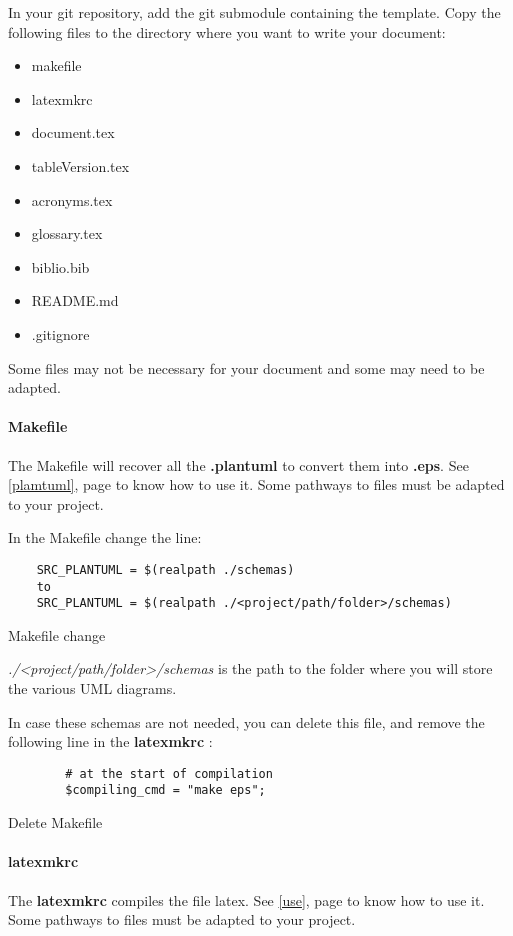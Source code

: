 In your git repository, add the git submodule containing the template.
Copy the following files to the directory where you want to write your document:
\begin{itemize}
    \item makefile
    \item latexmkrc
    \item document.tex
    \item tableVersion.tex
    \item acronyms.tex
    \item glossary.tex
    \item biblio.bib
    \item README.md
    \item .gitignore
\end{itemize}

Some files may not be necessary for your document and some may need to be adapted.

\paragraph{Makefile}
The Makefile will recover all the \textbf{.plantuml} to convert them into \textbf{.eps}. See
\ref{plamtuml}, page \pageref{plamtuml} to know how to use it.
Some pathways to files must be adapted to your project.

In the Makefile change the line:
\begin{code}
    \begin{verbatim}
    SRC_PLANTUML = $(realpath ./schemas)
    to
    SRC_PLANTUML = $(realpath ./<project/path/folder>/schemas)
\end{verbatim}
    \caption{Makefile change}
\end{code}

\emph{./<project/path/folder>/schemas} is the path to the folder where you will store the various
UML diagrams.\newline

In case these schemas are not needed, you can delete this file, and remove the following line in the
\textbf{latexmkrc} :
\begin{code}
    \begin{verbatim}
        # at the start of compilation
        $compiling_cmd = "make eps";
    \end{verbatim}
    \caption{Delete Makefile}
\end{code}


\paragraph{latexmkrc}
The \textbf{latexmkrc} compiles the file \gls{latex}. See \ref{use}, page \pageref{use} to know how
to use it.
Some pathways to files must be adapted to your project.

